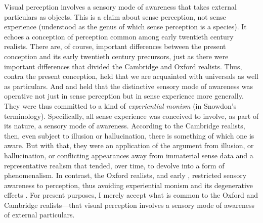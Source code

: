 \documentclass[12pt]{article}
\begin{document}
Visual perception involves a sensory mode of awareness that takes external particulars as objects. This is a claim about sense perception, not sense experience (understood as the genus of which sense perception is a species). It echoes a conception of perception common among early twentieth century realists. There are, of course, important differences between the present conception and its early twentieth century precursors, just as there were important differences that divided the Cambridge and Oxford realists. Thus, contra the present conception, \citet[]{Russell:1912uq} held that we are acquainted with universals as well as particulars. And \citet[]{Russell:1912uq} and \citet[]{Price:1932fk} held that the distinctive sensory mode of awareness was operative not just in sense perception but in sense experience more generally. They were thus committed to a kind of \emph{experiential monism} (in Snowdon's \citeyear{Snowdon:2008oz} terminology). Specifically, all sense experience was conceived to involve, as part of its nature, a sensory mode of awareness. According to the Cambridge realists, then, even subject to illusion or hallucination, there is something of which one is aware. But with that, they were an application of the argument from illusion, or hallucination, or conflicting appearances away from immaterial sense data and a representative realism that tended, over time, to devolve into a form of phenomenalism. In contrast, the Oxford realists, \citet{Cook-Wilson:1926sf} and early \citet{Prichard:1906gf,Prichard:1909yg}, restricted sensory awareness to perception, thus avoiding experiential monism and its degenerative effects  \citep[see][]{Marion:2000kl,Marion:2000ai,Kalderon:2010fk}. For present purposes, I merely accept what is common to the Oxford and Cambridge realists---that visual perception involves a sensory mode of awareness of external particulars.
\end{document}

